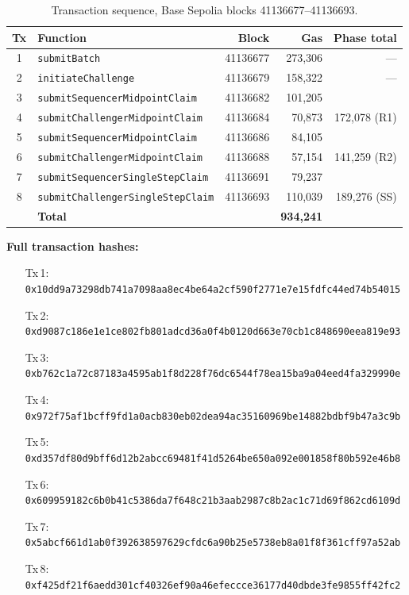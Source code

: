 \documentclass[11pt,letterpaper]{article}
\begin{document}
\begin{table}[h!]
\centering
\small
\renewcommand{\arraystretch}{1.2}
\begin{tabular}{clrrr}
\toprule
\textbf{Tx} & \textbf{Function} & \textbf{Block} & \textbf{Gas} & \textbf{Phase total} \\
\midrule
1 & \texttt{submitBatch}                     & 41136677 & 273,306 & --- \\
2 & \texttt{initiateChallenge}               & 41136679 & 158,322 & --- \\
3 & \texttt{submitSequencerMidpointClaim}    & 41136682 & 101,205 & \\
4 & \texttt{submitChallengerMidpointClaim}   & 41136684 &  70,873 & 172,078 (R1) \\
5 & \texttt{submitSequencerMidpointClaim}    & 41136686 &  84,105 & \\
6 & \texttt{submitChallengerMidpointClaim}   & 41136688 &  57,154 & 141,259 (R2) \\
7 & \texttt{submitSequencerSingleStepClaim}  & 41136691 &  79,237 & \\
8 & \texttt{submitChallengerSingleStepClaim} & 41136693 & 110,039 & 189,276 (SS) \\
\midrule
  & \textbf{Total} & & \textbf{934,241} & \\
\bottomrule
\end{tabular}
\caption{Transaction sequence, Base Sepolia blocks 41136677--41136693.}
\label{tab:txdata}
\end{table}

\noindent\textbf{Full transaction hashes:}
\begin{itemize}[leftmargin=1.2em, itemsep=0pt, topsep=2pt]
\item[\small Tx\,1:] \texttt{\footnotesize 0x10dd9a73298db741a7098aa8ec4be64a2cf590f2771e7e15fdfc44ed74b54015}
\item[\small Tx\,2:] \texttt{\footnotesize 0xd9087c186e1e1ce802fb801adcd36a0f4b0120d663e70cb1c848690eea819e93}
\item[\small Tx\,3:] \texttt{\footnotesize 0xb762c1a72c87183a4595ab1f8d228f76dc6544f78ea15ba9a04eed4fa329990e}
\item[\small Tx\,4:] \texttt{\footnotesize 0x972f75af1bcff9fd1a0acb830eb02dea94ac35160969be14882bdbf9b47a3c9b}
\item[\small Tx\,5:] \texttt{\footnotesize 0xd357df80d9bff6d12b2abcc69481f41d5264be650a092e001858f80b592e46b8}
\item[\small Tx\,6:] \texttt{\footnotesize 0x609959182c6b0b41c5386da7f648c21b3aab2987c8b2ac1c71d69f862cd6109d}
\item[\small Tx\,7:] \texttt{\footnotesize 0x5abcf661d1ab0f392638597629cfdc6a90b25e5738eb8a01f8f361cff97a52ab}
\item[\small Tx\,8:] \texttt{\footnotesize 0xf425df21f6aedd301cf40326ef90a46efeccce36177d40dbde3fe9855ff42fc2}
\end{itemize}
\end{document}
